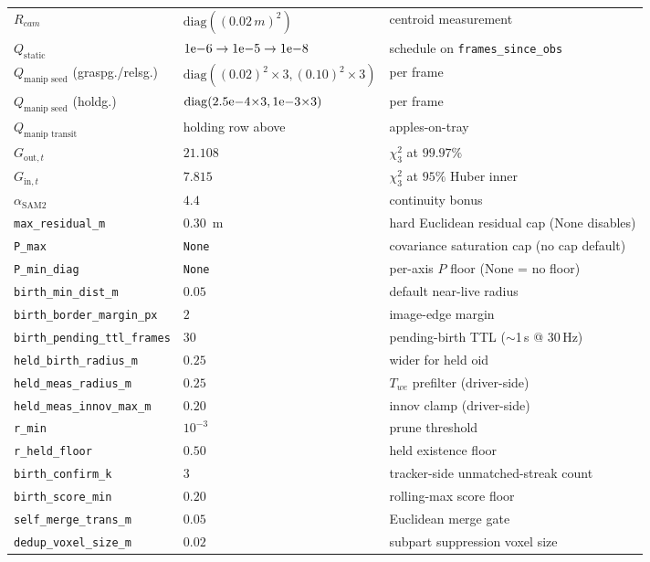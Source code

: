 \documentclass[11pt]{article}
\begin{document}
\begin{tabular}{@{}lll@{}}
$R_{cam}$ & $\mathrm{diag}((0.02\,m)^2)$ & centroid measurement \\
$Q_{\text{static}}$ & $1{\rm e}{-6}\to1{\rm e}{-5}\to1{\rm e}{-8}$ & schedule on \texttt{frames\_since\_obs} \\
$Q_{\text{manip seed}}$ (graspg./relsg.) & $\mathrm{diag}((0.02)^2{\times}3,(0.10)^2{\times}3)$ & per frame \\
$Q_{\text{manip seed}}$ (holdg.) & $\mathrm{diag}(2.5{\rm e}{-4}{\times}3,1{\rm e}{-3}{\times}3)$ & per frame \\
$Q_{\text{manip transit}}$ & holding row above & apples-on-tray \\
$G_{\text{out},t}$ & $21.108$ & $\chi^2_3$ at $99.97\%$ \\
$G_{\text{in},t}$ & $7.815$ & $\chi^2_3$ at $95\%$ Huber inner \\
$\alpha_{\text{SAM2}}$ & $4.4$ & continuity bonus \\
\texttt{max\_residual\_m} & $0.30$~m & hard Euclidean residual cap (None disables) \\
\texttt{P\_max} & \texttt{None} & covariance saturation cap (no cap default) \\
\texttt{P\_min\_diag} & \texttt{None} & per-axis $P$ floor (None = no floor) \\
\texttt{birth\_min\_dist\_m} & $0.05$ & default near-live radius \\
\texttt{birth\_border\_margin\_px} & $2$ & image-edge margin \\
\texttt{birth\_pending\_ttl\_frames} & $30$ & pending-birth TTL ($\sim$1\,s @ 30\,Hz) \\
\texttt{held\_birth\_radius\_m} & $0.25$ & wider for held oid \\
\texttt{held\_meas\_radius\_m} & $0.25$ & $T_{we}$ prefilter (driver-side) \\
\texttt{held\_meas\_innov\_max\_m} & $0.20$ & innov clamp (driver-side) \\
\texttt{r\_min} & $10^{-3}$ & prune threshold \\
\texttt{r\_held\_floor} & $0.50$ & held existence floor \\
\texttt{birth\_confirm\_k} & $3$ & tracker-side unmatched-streak count \\
\texttt{birth\_score\_min} & $0.20$ & rolling-max score floor \\
\texttt{self\_merge\_trans\_m} & $0.05$ & Euclidean merge gate \\
\texttt{dedup\_voxel\_size\_m} & $0.02$ & subpart suppression voxel size \\

\end{tabular}
\end{document}
